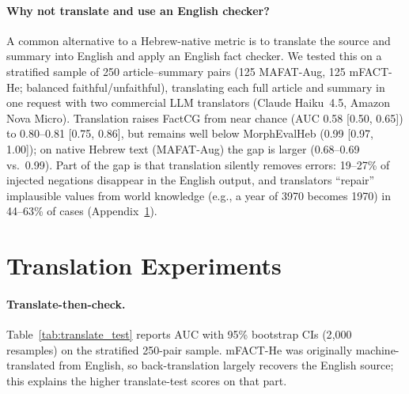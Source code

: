 
\paragraph{Why not translate and use an English checker?}
A common alternative to a Hebrew-native metric is to translate the source and summary into English and apply an English fact checker.
We tested this on a stratified sample of 250 article--summary pairs (125 MAFAT-Aug, 125 mFACT-He; balanced faithful/unfaithful), translating each full article and summary in one request with two commercial LLM translators (Claude Haiku~4.5, Amazon Nova Micro).
Translation raises FactCG from near chance (AUC 0.58 [0.50, 0.65]) to 0.80--0.81 [0.75, 0.86], but remains well below MorphEvalHeb (0.99 [0.97, 1.00]); on native Hebrew text (MAFAT-Aug) the gap is larger (0.68--0.69 vs.\ 0.99).
Part of the gap is that translation silently removes errors: 19--27\% of injected negations disappear in the English output, and translators ``repair'' implausible values from world knowledge (e.g., a year of 3970 becomes 1970) in 44--63\% of cases (Appendix~\ref{app:translation}).

\section{Translation Experiments}\label{app:translation}

\paragraph{Translate-then-check.} Table~\ref{tab:translate_test} reports AUC with 95\% bootstrap CIs (2{,}000 resamples) on the stratified 250-pair sample. mFACT-He was originally machine-translated from English, so back-translation largely recovers the English source; this explains the higher translate-test scores on that part.

